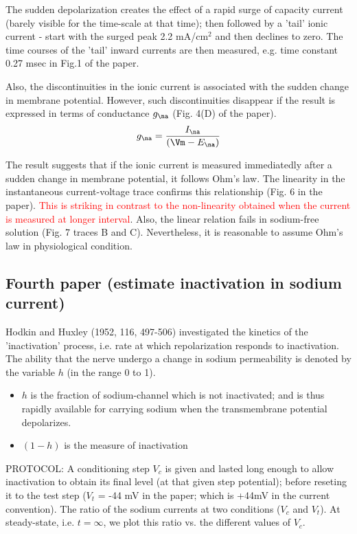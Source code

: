The sudden depolarization creates the effect of a rapid surge of capacity
current (barely visible for the time-scale at that time); then followed by a
'tail' ionic current - start with the surged peak 2.2 mA/cm$^2$ and then
declines to zero. The time courses of the 'tail' inward currents are then
measured, e.g. time constant 0.27 msec in Fig.1 of the paper.

Also, the discontinuities in the ionic current is associated with the sudden
change in membrane potential. However, such discontinuities disappear if the
result is expressed in terms of conductance $g_\na$ (Fig. 4(D) of the paper).
\begin{equation}
g_\na = \frac{I_{\na}}{(\Vm - E_\na)}
\end{equation}

The result suggests that if the ionic current is measured immediatedly
after a sudden change in membrane potential, it follows Ohm's law. The linearity
in the instantaneous current-voltage trace confirms this relationship (Fig. 6
in the paper). \textcolor{red}{This is striking in contrast to the
non-linearity obtained when the current is measured at longer interval}.
Also, the linear relation fails in sodium-free solution (Fig. 7 traces B and C).
Nevertheless, it is reasonable to assume Ohm's law in physiological condition.



\subsection{Fourth paper (estimate inactivation in sodium current)}

Hodkin and Huxley (1952, 116, 497-506) investigated the kinetics of the
'inactivation' process, i.e. rate at which repolarization responds to
inactivation. The ability that the nerve undergo a change in sodium permeability
is denoted by the variable $h$ (in the range 0 to 1). 
\begin{itemize}
  \item $h$ is the fraction of sodium-channel which is not inactivated;
  and is thus rapidly available for carrying sodium when the transmembrane
  potential depolarizes.
  
  \item $(1-h)$ is the measure of inactivation
\end{itemize}

PROTOCOL: A conditioning step $V_c$ is given and lasted long enough to allow
inactivation to obtain its final level (at that given step potential); before
reseting it to the test step ($V_t$ = -44 mV in the paper; which is +44mV in the
current convention). The ratio of the sodium currents at two conditions ($V_c$
and $V_t$). At steady-state, i.e. $t=\infty$, we plot this ratio vs. the
different values of $V_c$.

